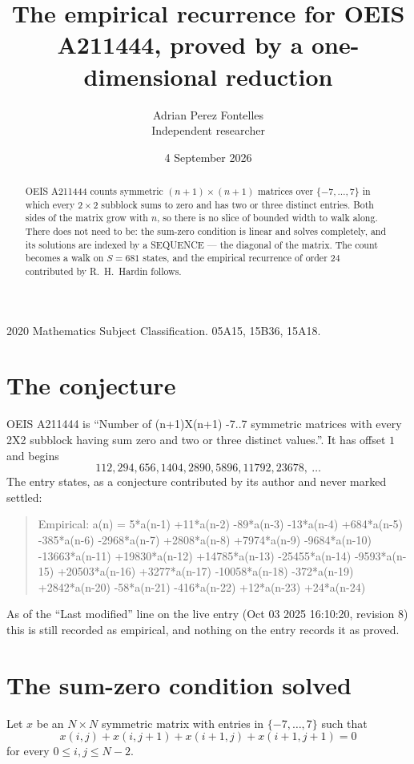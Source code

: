 \documentclass[11pt,a4paper]{article}
\title{The empirical recurrence for OEIS A211444, proved by a one-dimensional reduction}
\author{Adrian Perez Fontelles\\ \small Independent researcher}
\date{4 September 2026}
\theoremstyle{plain}
\theoremstyle{definition}
\begin{document}
\maketitle

\begin{abstract}
OEIS A211444 counts symmetric $(n+1)\times(n+1)$ matrices over
$\{-7,\dots,7\}$ in which every $2\times2$ subblock sums to zero and has two or three distinct
entries. Both sides of the matrix grow with $n$, so there is no slice of bounded width to walk
along. There does not need to be: the sum-zero condition is linear and solves completely, and
its solutions are indexed by a SEQUENCE --- the diagonal of the matrix. The count becomes a walk
on $S=681$ states, and the empirical recurrence of order $24$ contributed by R.~H.~Hardin
follows.
\end{abstract}

\noindent\small 2020 Mathematics Subject Classification. 05A15, 15B36, 15A18.\normalsize

\section{The conjecture}

OEIS A211444 is ``Number of (n+1)X(n+1) -7..7 symmetric matrices with every 2X2 subblock having sum zero and two or three distinct values.''. It has offset $1$ and begins
\[
112, 294, 656, 1404, 2890, 5896, 11792, 23678,\ \dots
\]
The entry states, as a conjecture contributed by its author and never marked settled:
\begin{quote}
Empirical: a(n) = 5*a(n-1) +11*a(n-2) -89*a(n-3) -13*a(n-4) +684*a(n-5) -385*a(n-6) -2968*a(n-7) +2808*a(n-8) +7974*a(n-9) -9684*a(n-10) -13663*a(n-11) +19830*a(n-12) +14785*a(n-13) -25455*a(n-14) -9593*a(n-15) +20503*a(n-16) +3277*a(n-17) -10058*a(n-18) -372*a(n-19) +2842*a(n-20) -58*a(n-21) -416*a(n-22) +12*a(n-23) +24*a(n-24)
\end{quote}
As of the ``Last modified'' line on the live entry (Oct 03 2025 16:10:20, revision 8) this is still
recorded as empirical, and nothing on the entry records it as proved.

\section{The sum-zero condition solved}

Let $x$ be an $N\times N$ symmetric matrix with entries in $\{-7,\dots,7\}$ such that
\[
x(i,j)+x(i,j{+}1)+x(i{+}1,j)+x(i{+}1,j{+}1)=0
\]
for every $0\le i,j\le N-2$.
\end{document}
